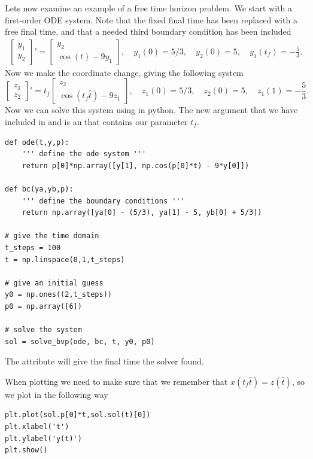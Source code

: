 Lets now examine an example of a free time horizon problem.
We start with a first-order ODE system. Note that the fixed final time has been replaced with a free final time, and that a needed third boundary condition has been included
\begin{align*}
    \begin{bmatrix}
        y_1\\y_2
    \end{bmatrix}'
    =
    \begin{bmatrix}
        y_2 \\
        \cos(t) - 9y_1
    \end{bmatrix},
    \quad y_1(0) = 5/3,\quad y_2(0) = 5,\quad y_1(t_f) = -\frac{5}{3}.
\end{align*}
Now we make the coordinate change, giving the following system
\begin{equation}\label{ex:bvp2}
    \begin{bmatrix}
        z_1\\z_2
    \end{bmatrix}'
    =
    t_f\begin{bmatrix}
        z_2 \\
        \cos( t_f \hat{t}) - 9z_1
    \end{bmatrix},
    \quad z_1(0) = 5/3,\quad z_2(0) = 5,\quad z_1(1) = -\frac{5}{3}.
\end{equation}
Now we can solve this system using  in python.
The new argument  that we have included in  and  is an  that contains our parameter $t_f$.

\begin{lstlisting}
def ode(t,y,p):
    ''' define the ode system '''
    return p[0]*np.array([y[1], np.cos(p[0]*t) - 9*y[0]])

def bc(ya,yb,p):
    ''' define the boundary conditions '''
    return np.array([ya[0] - (5/3), ya[1] - 5, yb[0] + 5/3])

# give the time domain
t_steps = 100
t = np.linspace(0,1,t_steps)

# give an initial guess
y0 = np.ones((2,t_steps))
p0 = np.array([6])

# solve the system
sol = solve_bvp(ode, bc, t, y0, p0)
\end{lstlisting}
The attribute  will give the final time the solver found.

When plotting we need to make sure that we remember that $x(t_f\hat{t}) = z(\hat{t})$, so we plot in the following way
\begin{lstlisting}
plt.plot(sol.p[0]*t,sol.sol(t)[0])
plt.xlabel('t')
plt.ylabel('y(t)')
plt.show()
\end{lstlisting}

